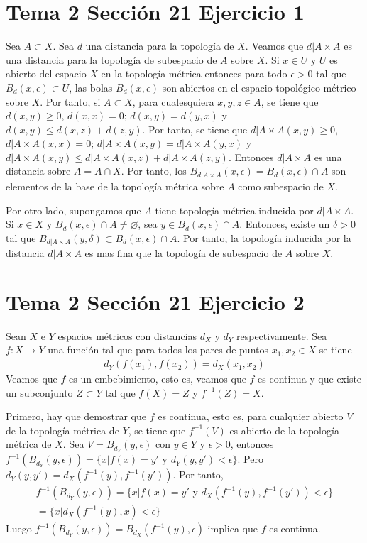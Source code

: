 \documentclass{article}
\begin{document}
\section{Tema 2 Sección 21 Ejercicio 1}
Sea $A\subset X$. Sea $d$ una distancia para la topología de $X$. Veamos que $d|A\times A$ es una distancia para la topología de subespacio de $A$ sobre $X$. Si $x\in U$ y $U$ es abierto del espacio $X$ en la topología métrica entonces para todo $\epsilon>0$ tal que $B_d(x,\epsilon)\subset U$, las bolas $B_d(x,\epsilon)$ son abiertos en el espacio topológico métrico sobre $X$. Por tanto, si $A\subset X$, para cualesquiera $x,y,z\in A$, se tiene que $d(x,y)\geq 0$, $d(x,x)=0$;  $d(x,y)=d(y,x)$ y  $d(x,y)\leq d(x,z)+d(z,y)$. Por tanto, se tiene que $d|A\times A(x,y)\geq 0$, $d|A\times A(x,x)=0$;  $d|A\times A(x,y)=d|A\times A(y,x)$ y  $d|A\times A(x,y)\leq d|A\times A(x,z)+d|A\times A(z,y)$. Entonces $d|A\times A$ es una distancia sobre $A=A\cap X$. Por tanto, los $B_{d|A\times A}(x,\epsilon)=B_d(x,\epsilon)\cap A$ son elementos de la base de la topología métrica sobre $A$ como subespacio de $X$.

Por otro lado, supongamos que $A$ tiene topología métrica inducida por $d|A\times A$. Si $x\in X$ y $B_d(x,\epsilon)\cap A\neq \varnothing$, sea $y\in B_d(x,\epsilon)\cap A$. Entonces, existe un $\delta>0$ tal que $B_{d|A\times A}(y,\delta)\subset B_d(x,\epsilon)\cap A$. Por tanto, la topología inducida por la distancia $d|A\times A$ es mas fina que la topología de subespacio de $A$ sobre $X$. 
\section{Tema 2 Sección 21 Ejercicio 2}
Sean $X$ e $Y$ espacios métricos con distancias $d_X$ y $d_Y$ respectivamente. Sea $f:X\rightarrow Y$ una función tal que para todos los pares de puntos $x_1,x_2\in X$ se tiene 
\begin{eqnarray}
d_Y(f(x_1),f(x_2))=d_X(x_1,x_2)\nonumber
\end{eqnarray}
Veamos que $f$ es un embebimiento, esto es, veamos que $f$ es continua y que existe un subconjunto $Z\subset Y$ tal que $f(X)=Z$ y $f^{-1}(Z)=X$.

Primero, hay que demostrar que $f$ es continua, esto es, para cualquier abierto $V$ de la topología métrica de $Y$, se tiene que $f^{-1}(V)$ es abierto de la topología métrica de $X$. Sea $V=B_{d_Y}(y,\epsilon)$ con $y\in Y$ y $\epsilon>0$, entonces $f^{-1}(B_{d_Y}(y,\epsilon))=\{x|f(x)=y' \text{ y }d_Y(y,y')<\epsilon\}$. Pero $d_Y(y,y')=d_X(f^{-1}(y),f^{-1}(y'))$. Por tanto,
\begin{eqnarray}
 f^{-1}(B_{d_Y}(y,\epsilon))=\{x|f(x)=y' \text{ y }d_X(f^{-1}(y),f^{-1}(y'))<\epsilon\}\nonumber\\
=\{x|d_X(f^{-1}(y),x)<\epsilon\}
\nonumber
\end{eqnarray}
Luego $f^{-1}(B_{d_Y}(y,\epsilon))=B_{d_X}(f^{-1}(y),\epsilon)$ implica que $f$ es continua.
\end{document}
